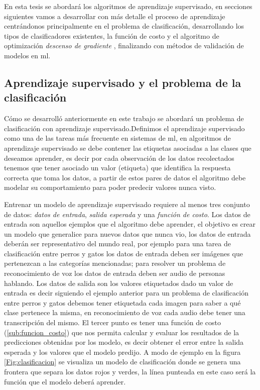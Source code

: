 En esta tesis se abordará los algoritmos de aprendizaje supervisado, en secciones siguientes vamos a desarrollar con más detalle el proceso de aprendizaje centrándonos principalmente en el problema de clasificación, desarrollando los tipos de clasificadores existentes, la función de costo y el algoritmo de optimización \textit{descenso de gradiente} \citep{cnns}, finalizando con métodos de validación de modelos en \ac{ml}.

\subsection{Aprendizaje supervisado y el problema de la clasificación}\label{sub:aprendizaje_supervisado}

Cómo se desarrolló anteriormente en este trabajo se abordará un problema de clasificación con aprendizaje supervisado.Definimos  el aprendizaje supervisado como una de las tareas más frecuente en sistemas de \ac{ml}, en algoritmos de aprendizaje supervisado se debe contener las etiquetas asociadas a las clases que deseamos aprender, es decir por cada observación de los datos recolectados tenemos que tener asociado un valor (etiqueta) que identifica la respuesta correcta que toma los datos, a partir de estos pares de datos el algoritmo debe modelar su comportamiento para poder predecir valores nunca visto.

Entrenar un modelo de aprendizaje supervisado requiere al menos tres conjunto de datos:  \textit{datos de entrada}, \textit{salida esperada} y una \textit{función de costo}.  Los datos de entrada son aquellos ejemplos que el algoritmo debe aprender, el objetivo es crear un modelo que generalice para nuevos datos que nunca vio, los datos de entrada deberán ser representativo del mundo real, por ejemplo para una tarea de clasificación entre perros y gatos los datos de entrada deben ser imágenes que pertenezcan a las categorías mencionadas; para resolver un problema de reconocimiento de voz los datos de entrada deben ser audio de personas hablando. Los datos de salida son los valores etiquetados dado un valor de entrada es decir siguiendo el ejemplo anterior para un problema de clasificación entre perros y gatos debemos tener etiquetada cada imagen para saber a qué clase pertenece la misma, en reconocimiento de voz cada audio debe tener una transcripción del mismo. El tercer punto es tener una función de costo (\ref{sub:funcion_costo}) que nos permita calcular y evaluar  los resultados de la predicciones obtenidas por los modelo, es decir obtener el error entre la salida esperada y los valores que el modelo predijo. A modo de ejemplo en la figura \ref{Fig:clasificacion} se visualiza un modelo de clasificación donde se  genera una frontera que separa los datos rojos y verdes, la línea punteada en este caso será la función que el modelo deberá aprender.

